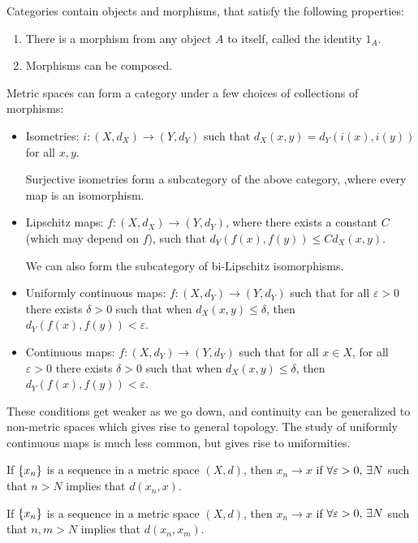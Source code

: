 Categories contain objects and morphisms, that satisfy the following properties:
\begin{enumerate}
    \item There is a morphism from any object $A$ to itself, called the identity $1_A$.
    \item Morphisms can be composed.
\end{enumerate}

Metric spaces can form a category under a few choices of collections of morphisms:
\begin{itemize}
    \item Isometries: $i\colon (X, d_X) \to (Y, d_Y)$ such that $d_X(x, y) = d_Y(i(x), i(y))$ for all $x, y$.
    
    Surjective isometries form a subcategory of the above category, ,where every map is an isomorphism.
    \item Lipschitz maps: $f\colon (X, d_X) \to (Y, d_Y)$, where there exists a constant $C$ (which may depend on $f$), such that $d_Y(f(x), f(y)) \le Cd_X(x, y)$.
    
    We can also form the subcategory of bi-Lipschitz isomorphisms.
    
    \item Uniformly continuous maps: $f\colon (X, d_Y) \to (Y, d_Y)$ such that for all $\varepsilon > 0$ there exists $\delta > 0$ such that when $d_X(x, y) \le \delta$, then $d_Y(f(x), f(y)) < \varepsilon$.
    \item Continuous maps: $f\colon (X, d_Y) \to (Y, d_Y)$ such that for all $x \in X$, for all $\varepsilon > 0$ there exists $\delta > 0$ such that when $d_X(x, y) \le \delta$, then $d_Y(f(x), f(y)) < \varepsilon$.
\end{itemize}

These conditions get weaker as we go down, and continuity can be generalized to non-metric spaces which gives rise to general topology. The study of uniformly continuous maps is much less common, but gives rise to uniformities.

\begin{definition}[Convergence]
    If $\qty{x_n}$ is a sequence in a metric space $(X, d)$, then $x_n \to x$ if $\forall \varepsilon > 0,\, \exists N$ such that $n > N$ implies that $d(x_n, x)$.
\end{definition}

\begin{definition}
    If $\qty{x_n}$ is a sequence in a metric space $(X, d)$, then $x_n \to x$ if $\forall \varepsilon > 0,\, \exists N$ such that $n, m > N$ implies that $d(x_n, x_m)$.
\end{definition}

